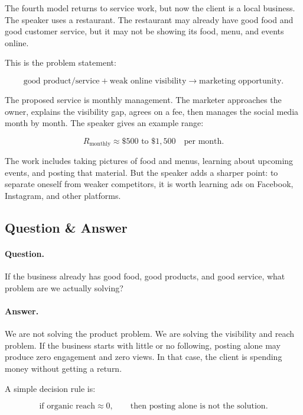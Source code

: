 The fourth model returns to service work, but now the client is a local business. The speaker uses a restaurant. The restaurant may already have good food and good customer service, but it may not be showing its food, menu, and events online.

This is the problem statement:

\begin{equation}
\text{good product/service}
+
\text{weak online visibility}
\longrightarrow
\text{marketing opportunity}.
\end{equation}

The proposed service is monthly management. The marketer approaches the owner, explains the visibility gap, agrees on a fee, then manages the social media month by month. The speaker gives an example range:

\begin{equation}
R_{\mathrm{monthly}}
\approx
\$500 \text{ to } \$1{,}500
\quad \text{per month}.
\end{equation}

The work includes taking pictures of food and menus, learning about upcoming events, and posting that material. But the speaker adds a sharper point: to separate oneself from weaker competitors, it is worth learning ads on Facebook, Instagram, and other platforms.

\subsection{Question \& Answer}

\paragraph{Question.}
If the business already has good food, good products, and good service, what problem are we actually solving?

\paragraph{Answer.}
We are not solving the product problem. We are solving the visibility and reach problem. If the business starts with little or no following, posting alone may produce zero engagement and zero views. In that case, the client is spending money without getting a return.

A simple decision rule is:

\begin{equation}
\text{if organic reach} \approx 0,
\qquad
\text{then posting alone is not the solution}.
\end{equation}

